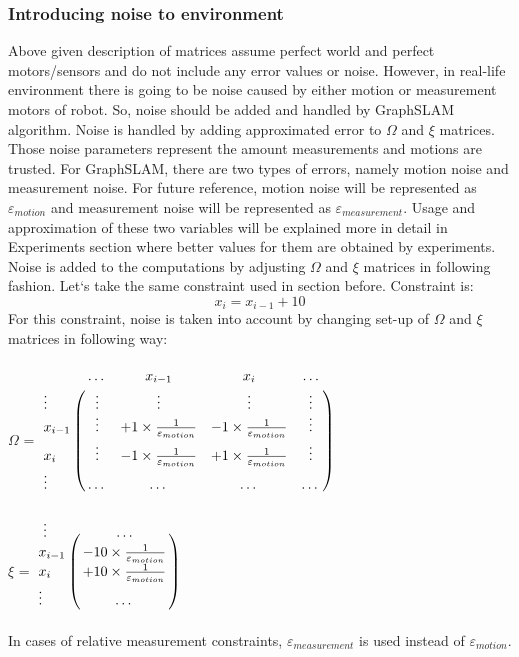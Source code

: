 \documentclass{ba-kecs}
\numberwithin{figure}{section}
\numberwithin{equation}{section}
\begin{document}
{\subsubsection{Introducing noise to environment}
Above given description of matrices assume perfect world and perfect motors/sensors and do not include any error values or noise. However, in real-life environment there is going to be noise caused by either motion or measurement motors of robot. So, noise should be added and handled by GraphSLAM algorithm. Noise is handled by adding approximated error to $\Omega$ and $\xi$ matrices. Those noise parameters represent the amount measurements and motions are trusted. For GraphSLAM, there are two types of errors, namely motion noise and measurement noise. For future reference, motion noise will be represented as $\varepsilon_{motion}$ and measurement noise will be represented as $\varepsilon_{measurement}$. Usage and approximation of these two variables will be explained more in detail in Experiments section where better values for them are obtained by experiments. Noise is added to the computations by adjusting $\Omega$ and $\xi$ matrices in following fashion. Let`s take the same constraint used in section before. Constraint is:
\[ x_{i} = x_{i-1} + 10 \]
For this constraint, noise is taken into account by changing set-up of $\Omega$ and $\xi$ matrices in following way:\\ \\

$\Omega$ = $\bordermatrix{~ & \dots & x_{i-1} & x_{i} & \dots \cr
							\vdots & \vdots & \vdots & \vdots & \vdots \cr
                  			x_{i-1} & \vdots & +1 \times \frac{1}{\varepsilon_{motion}} & -1 \times \frac{1}{\varepsilon_{motion}} & \vdots \cr
                  			x_{i} & \vdots & -1 \times \frac{1}{\varepsilon_{motion}} & +1 \times \frac{1}{\varepsilon_{motion}} & \vdots \cr
                  			\vdots & \dots & \dots & \dots & \dots \cr}$ \\ \\
                  			
    $\xi$ = $\bordermatrix{~ \vdots & \dots \cr
                  			x_{i-1} & -10 \times \frac{1}{\varepsilon_{motion}} \cr
                  			x_{i}  & +10 \times \frac{1}{\varepsilon_{motion}} \cr
                  			\vdots & \dots \cr}$\\ \\
                  			
In cases of relative measurement constraints, $\varepsilon_{measurement}$ is used instead of $\varepsilon_{motion}$.
	
}
\end{document}
